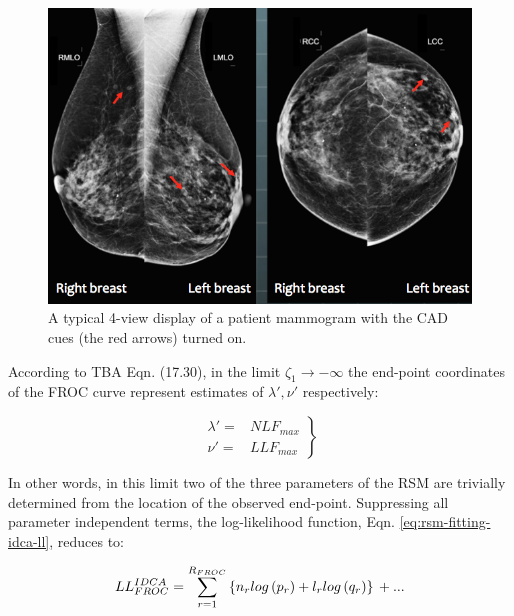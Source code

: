\documentclass[
]{book}
\begin{document}
\begin{figure}

{\centering \includegraphics{images/rsm-fitting/two-views} 

}

\caption{A typical 4-view display of a patient mammogram with the CAD cues (the red arrows) turned on.}\label{fig:rsm-fitting-fig1}
\end{figure}

According to TBA Eqn. (17.30), in the limit \(\zeta_1 \rightarrow -\infty\) the end-point coordinates of the FROC curve represent estimates of \(\lambda', \nu'\) respectively:

\begin{equation}
\left. 
\begin{aligned}
\lambda' = & NLF_{max} \\
\nu' = & LLF_{max} 
\end{aligned}
\right \}
\label{eq:rsm-fitting-nlf-llf-max}
\end{equation}

In other words, in this limit two of the three parameters of the RSM are trivially determined from the location of the observed end-point. Suppressing all parameter independent terms, the log-likelihood function, Eqn. \eqref{eq:rsm-fitting-idca-ll}, reduces to:

\begin{equation}
LL_{FROC}^{IDCA} = \sum_{r=1}^{R_{FROC}} \left \{ n_r log\left ( p_r \right ) + l_r log\left ( q_r \right ) \right \} \\
+ ...
\label{eq:rsm-fitting-idca-ll2}
\end{equation}
\end{document}
